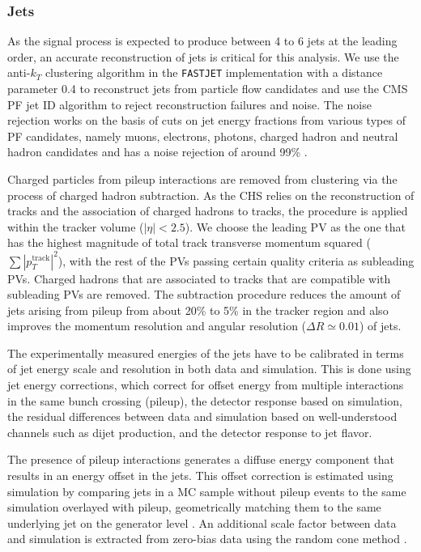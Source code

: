 \subsubsection{Jets}
\label{sec:object_id_jets}
As the signal process is expected to produce between 4 to 6 jets at the leading order, an accurate reconstruction of jets is critical for this analysis. We use the anti-$k_T$ clustering algorithm\cite{Cacciari:2008gp} in the \texttt{FASTJET} implementation\cite{Cacciari:2011ma} with a distance parameter 0.4 to reconstruct jets from particle flow candidates \cite{CMS:2010xta,CMS:2009nxa,CMS:2010byl} and use the CMS PF jet ID algorithm to reject reconstruction failures and noise. The noise rejection works on the basis of cuts on jet energy fractions from various types of PF candidates, namely muons, electrons, photons, charged hadron and neutral hadron candidates and has a noise rejection of around 99\% \cite{CMS:2017wyc}.

Charged particles from pileup interactions are removed from clustering via the process of charged hadron subtraction. As the CHS relies on the reconstruction of tracks and the association of charged hadrons to tracks, the procedure is applied within the tracker volume ($|\eta| < 2.5$). We choose the leading PV as the one that has the highest magnitude of total track transverse momentum squared ($\sum |p_T^{\mathrm{track}}|^2$), with the rest of the PVs passing certain quality criteria as subleading PVs. Charged hadrons that are associated to tracks that are compatible with subleading PVs are removed. The subtraction procedure reduces the amount of jets arising from pileup from about 20\% to 5\% in the tracker region and also improves the momentum resolution and angular resolution ($\Delta R \simeq 0.01$) of jets\cite{CMS:2014ata}.

The experimentally measured energies of the jets have to be calibrated in terms of jet energy scale and resolution in both data and simulation. This is done using jet energy corrections, which correct for offset energy from multiple interactions in the same bunch crossing (pileup), the detector response based on simulation, the residual differences between data and simulation based on well-understood channels such as dijet production, and the detector response to jet flavor. 

The presence of pileup interactions generates a diffuse energy component that results in an energy offset in the jets. This offset correction is estimated using simulation by comparing jets in a MC sample without pileup events to the same simulation overlayed with pileup, geometrically matching them to the same underlying jet on the generator level \cite{cms_jec_2017}. An additional scale factor between data and simulation is extracted from zero-bias data using the random cone method \cite{Chatrchyan:2011ds}.  

